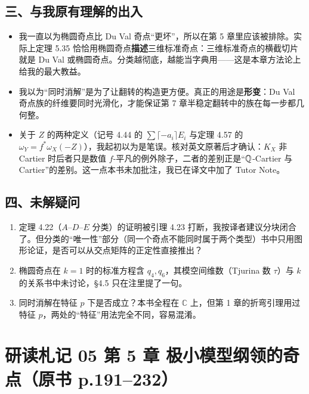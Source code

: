 \subsection*{三、与我原有理解的出入}

\begin{itemize}
\item 我一直以为椭圆奇点比 Du Val 奇点“更坏”，所以在第 5 章里应该被排除。实际上定理 5.35 恰恰用椭圆奇点\textbf{描述}三维标准奇点：三维标准奇点的横截切片就是 Du Val 或椭圆奇点。分类越彻底，越能当字典用——这是本章方法论上给我的最大教益。
\item 我以为“同时消解”是为了让翻转的构造更方便。真正的用途是\textbf{形变}：Du Val 奇点族的纤维要同时光滑化，才能保证第 7 章半稳定翻转中的族在每一步都几何整。
\item 关于 $Z$ 的两种定义（记号 4.44 的 $\sum\lceil-a_i\rceil E_i$ 与定理 4.57 的 $\omega_Y=f^*\omega_X(-Z)$），我起初以为是笔误。核对英文原著后才确认：$K_X$ 非 Cartier 时后者只是数值 $f$-平凡的例外除子，二者的差别正是“$\mathbb{Q}$-Cartier 与 Cartier”的差别。这一点本书未加批注，我已在译文中加了 Tutor Note。
\end{itemize}

\subsection*{四、未解疑问}

\begin{enumerate}
\item 定理 4.22（$A$--$D$--$E$ 分类）的证明被引理 4.23 打断，我按译者建议分块闭合了。但分类的“唯一性”部分（同一个奇点不能同时属于两个类型）书中只用图形论证，是否可以从交点矩阵的正定性直接推出？
\item 椭圆奇点在 $k=1$ 时的标准方程含 $q_4,q_6$，其模空间维数（Tjurina 数 $\tau$）与 $k$ 的关系书中未讨论，\S4.5 只在注里提了一句。
\item 同时消解在特征 $p$ 下是否成立？本书全程在 $\mathbb{C}$ 上，但第 1 章的折弯引理用过特征 $p$，两处的“特征”用法完全不同，容易混淆。
\end{enumerate}

\section*{研读札记 05 \textperiodcentered{} 第 5 章 极小模型纲领的奇点（原书 p.191--232）}

